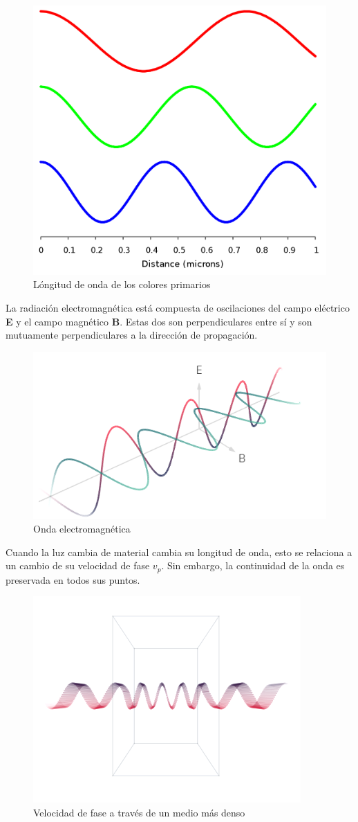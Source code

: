 \documentclass{article}
\begin{document}
\begin{figure}[H]
	\centering
	\includegraphics[width=0.45\linewidth]{Figuras/Longitud_de_onda_colores}
	\caption{Lóngitud de onda de los colores primarios}
	\label{fig:longituddeondacolores}
\end{figure}


La radiación electromagnética está compuesta de oscilaciones del campo eléctrico \textbf{E} y el campo magnético \textbf{B}. Estas dos son perpendiculares entre sí y son mutuamente perpendiculares a la dirección de propagación.

\begin{figure}[H]
	\centering
	\includegraphics[width=0.55\linewidth]{Figuras/EM_Wave}
	\caption{Onda electromagnética}
	\label{fig:emwave}
\end{figure}

Cuando la luz cambia de material cambia su longitud de onda, esto se relaciona a un cambio de su velocidad de fase $v_p$. Sin embargo, la continuidad de la onda es preservada en todos sus puntos.

\begin{figure}[H]
	\centering
	\includegraphics[width=0.55\linewidth]{Figuras/EM_Wave_Vp}
	\caption{Velocidad de fase a través de un medio más denso}
	\label{fig:emwavevp}
\end{figure}
\end{document}
